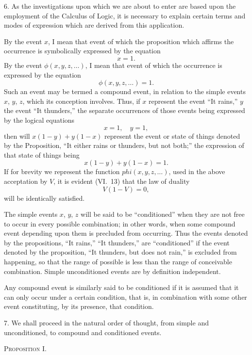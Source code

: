 \documentclass[oneside]{book}
\begin{document}
6. As the investigations upon which we are about to enter
are based upon the employment of the Calculus of Logic, it is
necessary to explain certain terms and modes of expression which
are derived from this application.

By the event $x$, I mean that event of which the proposition
which affirms the occurrence is symbolically expressed by the
equation
\[
x= 1.
\]
By the event $\phi(x,y,z,\dotsc)$, I mean that event of which the
occurrence is expressed by the equation
\[
\phi(x,y,z,\dotsc) = 1.
\]
Such an event may be termed a compound event, in relation to
the simple events $x$, $y$, $z$, which its conception involves. Thus,
if $x$ represent the event ``It rains,'' $y$ the event ``It thunders,''
the separate occurrences of those events being expressed by the
logical equations
\[
x = 1,\quad  y = 1,
\]
then will $x(1-y) + y (1-x)$ represent the event or state of
things denoted by the Proposition, ``It either rains or thunders,
but not both;'' the expression of that state of things being
\[
x(1 - y) + y(1 - x) = 1.
\]
If for brevity we represent the function $phi(x, y, z,\dotsc)$, used in
the above acceptation by $V$, it is evident (VI.~13) that the law
of duality
\[
V(1 - V) = 0,
\]
will be identically satisfied.

The simple events $x$, $y$, $z$ will be said to be ``conditioned''
when they are not free to occur in every possible combination;
in other words, when some compound event depending upon
them is precluded from occurring. Thus the events denoted by
the propositions, ``It rains,'' ``It thunders,'' are ``conditioned''
if the event denoted by the proposition, ``It thunders, but does
not rain,'' is excluded from happening, so that the range of possible
is less than the range of conceivable combination. Simple
unconditioned events are by definition independent.

Any compound event is similarly said to be conditioned if it
is assumed that it can only occur under a certain condition, that
is, in combination with some other event constituting, by its presence,
that condition.

7. We shall proceed in the natural order of thought, from
simple and unconditioned, to compound and conditioned events.
\newline
\newline
\begin{center}\textsc{Proposition I.}\newline\end{center}
\end{document}
